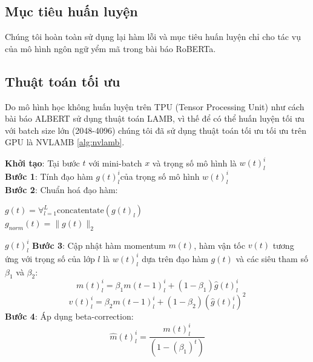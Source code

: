 \documentclass[10pt, conference, a4paper, compsocconf]{IEEEtran}
\begin{document}
\subsection{Mục tiêu huấn luyện}
Chúng tôi hoàn toàn sử dụng lại hàm lỗi và mục tiêu huấn luyện chỉ cho tác vụ của mô hình ngôn ngữ yểm mã trong bài báo RoBERTa\cite{Liu2019}.
\subsection{Thuật toán tối ưu}
Do mô hình học không huấn luyện trên TPU (Tensor Processing Unit) 
như cách bài báo ALBERT\cite{Lan2019} sử dụng thuật toán LAMB\cite{You2019}, vì thế để có thể huấn luyện tối ưu với batch size lớn (2048-4096) 
chúng tôi đã sử dụng thuật toán tối ưu tối ưu trên GPU là NVLAMB \ref{alg:nvlamb}.

\begin{algorithm}[!ht]
  \SetAlgoLined
   \textbf{Khởi tạo}: Tại bước $t$ với mini-batch $x$ và trọng số mô hình là $w(t)_{l}^{i}$\\
   \textbf{Bước 1}: Tính đạo hàm $g(t)_{l}^{i}$của trọng số mô hình $w(t)_{l}^{i}$ \\
   \textbf{Bước 2}: Chuẩn hoá đạo hàm:\\
   \begin{center}
    $g(t)= \forall_{l=1}^{L} \text {concatentate}(g(t)_{l})$ \\ 
    $g_{norm}(t)=\|g(t)\|_{2}$\\
   \end{center}
    {${g}(t)_{l}^{i}$}
   \textbf{Bước 3}: Cập nhật hàm momentum $m(t)$, hàm vận tốc $v(t)$ tương ứng với
   trọng số của lớp $l$ là $w(t)_{l}^{i}$ dựa trên đạo hàm $g(t)$ và các siêu tham số
   $\beta_{1}$ và $\beta_{2}$:\\
   \begin{equation}
    m(t)_{l}^{i}=\beta_{1} m(t-1)_{l}^{i}+\left(1-\beta_{1}\right) \widehat{g}(t)_{l}^{i}
   \end{equation}
   \begin{equation}
    v(t)_{l}^{i}=\beta_{2} m(t-1)_{l}^{i}+\left(1-\beta_{2}\right) (\widehat{g}(t)_{l}^{i})^{2}
   \end{equation}
   \textbf{Bước 4}: Áp dụng beta-correction:
   \begin{equation}
    \widehat{m}(t)_{l}^{i}=\frac{m(t)_{l}^{i}}{\left(1-\left(\beta_{1}\right)^{t}\right)}

\end{equation}
\end{algorithm}
\end{document}
